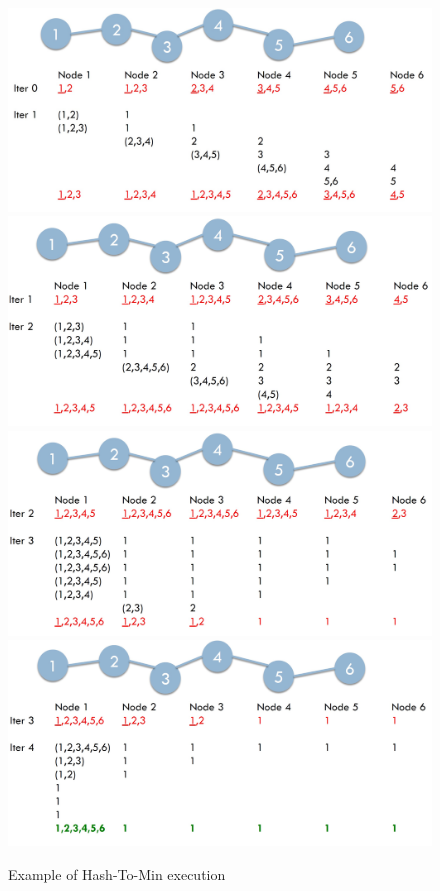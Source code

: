 \begin{figure}[h!]
		\centering
		\includegraphics[scale = 0.5]{img/htm1.jpg}
        \includegraphics[scale = 0.5]{img/htm2.jpg}
        \includegraphics[scale = 0.5]{img/htm3.jpg}
        \includegraphics[scale = 0.5]{img/htm4.jpg}
        \label{htm}
        \caption{Example of Hash-To-Min execution}
\end{figure}